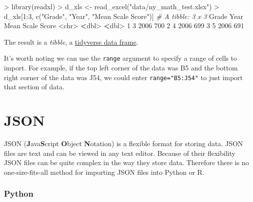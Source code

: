 \documentclass[
]{book}
\newenvironment{Shaded}{\begin{snugshade}}{\end{snugshade}}
\newcommand{\AttributeTok}[1]{\textcolor[rgb]{0.77,0.63,0.00}{#1}}
\newcommand{\CommentTok}[1]{\textcolor[rgb]{0.56,0.35,0.01}{\textit{#1}}}
\newcommand{\DecValTok}[1]{\textcolor[rgb]{0.00,0.00,0.81}{#1}}
\newcommand{\ErrorTok}[1]{\textcolor[rgb]{0.64,0.00,0.00}{\textbf{#1}}}
\newcommand{\FunctionTok}[1]{\textcolor[rgb]{0.00,0.00,0.00}{#1}}
\newcommand{\NormalTok}[1]{#1}
\newcommand{\OtherTok}[1]{\textcolor[rgb]{0.56,0.35,0.01}{#1}}
\newcommand{\SpecialCharTok}[1]{\textcolor[rgb]{0.00,0.00,0.00}{#1}}
\newcommand{\StringTok}[1]{\textcolor[rgb]{0.31,0.60,0.02}{#1}}
\begin{document}
\begin{Shaded}
\begin{Highlighting}[]
\SpecialCharTok{\textgreater{}} \FunctionTok{library}\NormalTok{(readxl)}
\SpecialCharTok{\textgreater{}}\NormalTok{ d\_xls }\OtherTok{\textless{}{-}} \FunctionTok{read\_excel}\NormalTok{(}\StringTok{"data/ny\_math\_test.xlsx"}\NormalTok{)}
\SpecialCharTok{\textgreater{}}\NormalTok{ d\_xls[}\DecValTok{1}\SpecialCharTok{:}\DecValTok{3}\NormalTok{, }\FunctionTok{c}\NormalTok{(}\StringTok{"Grade"}\NormalTok{, }\StringTok{"Year"}\NormalTok{, }\StringTok{"Mean Scale Score"}\NormalTok{)]}
\CommentTok{\# A tibble: 3 x 3}
\NormalTok{  Grade  Year }\StringTok{\textasciigrave{}}\AttributeTok{Mean Scale Score}\StringTok{\textasciigrave{}}
  \SpecialCharTok{\textless{}}\NormalTok{chr}\SpecialCharTok{\textgreater{}} \ErrorTok{\textless{}}\NormalTok{dbl}\SpecialCharTok{\textgreater{}}              \ErrorTok{\textless{}}\NormalTok{dbl}\SpecialCharTok{\textgreater{}}
\DecValTok{1} \DecValTok{3}      \DecValTok{2006}                \DecValTok{700}
\DecValTok{2} \DecValTok{4}      \DecValTok{2006}                \DecValTok{699}
\DecValTok{3} \DecValTok{5}      \DecValTok{2006}                \DecValTok{691}
\end{Highlighting}
\end{Shaded}

The result is a \emph{tibble}, a \href{https://tibble.tidyverse.org/}{tidyverse data frame}.

It's worth noting we can use the \texttt{range} argument to specify a range of cells to import. For example, if the top left corner of the data was B5 and the bottom right corner of the data was J54, we could enter \texttt{range="B5:J54"} to just import that section of data.

\hypertarget{json}{%
\section{JSON}\label{json}}

JSON (\textbf{J}ava\textbf{S}cript \textbf{O}bject \textbf{N}otation) is a flexible format for storing data. JSON files are text and can be viewed in any text editor. Because of their flexibility JSON files can be quite complex in the way they store data. Therefore there is no one-size-fits-all method for importing JSON files into Python or R.

\hypertarget{python-14}{%
\subsubsection*{Python}\label{python-14}}
\end{document}
